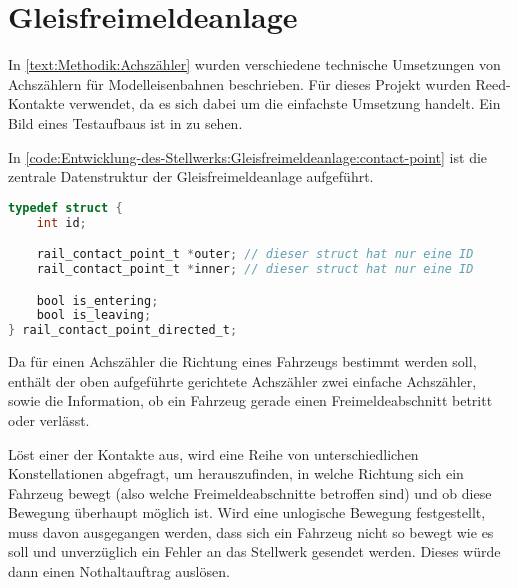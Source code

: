 \section{Gleisfreimeldeanlage}\label{text:Entwicklung-des-Stellwerks:Gleisfreimeldeanlage}

In \autoref{text:Methodik:Achszähler}  wurden verschiedene technische Umsetzungen von Achszählern für Modelleisenbahnen beschrieben. Für dieses Projekt wurden Reed-Kontakte verwendet, da es sich dabei um die einfachste Umsetzung handelt. Ein Bild eines Testaufbaus ist in  zu sehen.


In \autoref{code:Entwicklung-des-Stellwerks:Gleisfreimeldeanlage:contact-point} ist die zentrale Datenstruktur der Gleisfreimeldeanlage aufgeführt.

\begin{margin}
    \begin{lstlisting}[language=C, label=code:Entwicklung-des-Stellwerks:Gleisfreimeldeanlage:contact-point, caption={Repräsentation eines Kontaktpunktes mit Richtung}]
typedef struct {
    int id;

    rail_contact_point_t *outer; // dieser struct hat nur eine ID
    rail_contact_point_t *inner; // dieser struct hat nur eine ID

    bool is_entering;
    bool is_leaving;
} rail_contact_point_directed_t;
    \end{lstlisting}
\end{margin}

Da für einen Achszähler die Richtung eines Fahrzeugs bestimmt werden soll, enthält der oben aufgeführte gerichtete Achszähler zwei einfache Achszähler, sowie die Information, ob ein Fahrzeug gerade einen Freimeldeabschnitt betritt oder verlässt.

Löst einer der Kontakte aus, wird eine Reihe von unterschiedlichen Konstellationen abgefragt, um herauszufinden, in welche Richtung sich ein Fahrzeug bewegt (also welche Freimeldeabschnitte betroffen sind) und ob diese Bewegung überhaupt möglich ist. Wird eine unlogische Bewegung festgestellt, muss davon ausgegangen werden, dass sich ein Fahrzeug nicht so bewegt wie es soll und unverzüglich ein Fehler an das Stellwerk gesendet werden. Dieses würde dann einen Nothaltauftrag auslösen.
